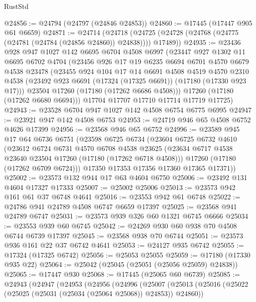 \begin{lexlean}{RustStd}
\begin{coremodule}
@24856 := @24794 (@24797 (@24846 @24853))
@24860 := @17445 (@17447 @905 @61 @6659)
@24871 := @24714
    (@24718 (@24725 (@24728 (@24768 (@24775 (@24781 (@24784 (@24856 @24860)) @24838)))) @17489))
@24935 := @23436
    @928
    @947
    @1027
    @142
    @6695
    @6704
    @4508
    @6997
    (@23447
      @927
      @1302
      @11
      @6695
      @6702
      @4704
      (@23456
        @926
        @17
        @19
        @6235
        @6694
        @6701
        @4570
        @6679
        @4538
        @23478
        (@23455
          @924
          @104
          @17
          @14
          @6691
          @4508
          @4519
          @4570
          @2310
          @4538
          (@23492 @923 @6691 (@17324 (@17325 @6691)) (@17180 (@17330 @923 @17)))
          @23504
          @17260
          (@17180 (@17262 @6686 @4508)))
        @17260
        (@17180 (@17262 @6680 @6694)))
      @17704
      @17707
      @17710
      @17714
      @17719
      @17725)
@24943 := @23528 @6704 @947 @1027 @142 @4508 @6754 @6775 @6995
@24947 := @23921 @947 @142 @4508 @6753
@24953 := @24719 @946 @65 @4508 @6752 @4626 @17399
@24956 := @23568 @946 @65 @6752
@24996 := @23589
    @945
    @17
    @64
    @6736
    @6751
    (@23598
      @6725
      @6734
      (@23604
        @6725
        @6732
        @4610
        (@23612
          @6724
          @6731
          @4570
          @6708
          @4538
          @23625
          (@23634 @6717 @4538 @23640 @23504 @17260 (@17180 (@17262 @6718 @4508)))
          @17260
          (@17180 (@17262 @6709 @6724)))
        @17350
        @17353
        @17356
        @17360
        @17365
        @17371))
@25002 := @23573 @132 @944 @17 @63 @4604 @6750
@25006 := @23492 @131 @4604 @17327 @17333
@25007 := @25002 @25006
@25013 := @23573 @942 @161 @61 @37 @6748 @4641
@25016 := @23553 @942 @61 @6748
@25022 := @24786 @941 @24789 @4508 @6747 @6659 @17397
@25025 := @23568 @941 @24789 @6747
@25031 := @23573 @939 @326 @60 @1321 @6745 @6666
@25034 := @23553 @939 @60 @6745
@25042 := @24269 @930 @60 @938 @70 @4508 @6744 @6739 @17397
@25045 := @23568 @938 @70 @6744
@25051 := @23573 @936 @161 @22 @37 @6742 @4641
@25053 := @24127 @935 @6742
@25055 := @17324 (@17325 @6742)
@25056 := @25053 @25055
@25059 := @17180 (@17330 @935 @22)
@25064 := @25042 (@25045 (@25051 (@25056 @25059) @24838))
@25065 := @17447 @930
@25068 := @17445 (@25065 @60 @6739)
@25085 := @24943
    (@24947
      (@24953
        (@24956
          (@24996
            (@25007
              (@25013
                (@25016 (@25022 (@25025 (@25031 (@25034 (@25064 @25068)) @24853)) @24860))

\end{coremodule}
\end{lexlean}
